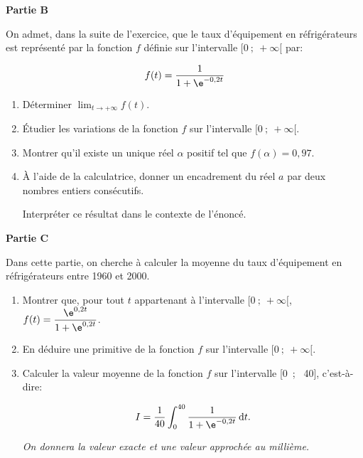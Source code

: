 \medskip

\textbf{Partie B}

\medskip

On admet, dans la suite de l'exercice, que le taux d'équipement en réfrigérateurs est représenté par la fonction $f$ définie sur l'intervalle $[0~;~+\infty[$ par:

\[f(t) = \dfrac{1}{1+ \e^{-0,2t}}\]

\begin{enumerate}
\item Déterminer $\displaystyle\lim_{t \to + \infty} f(t)$.
\item Étudier les variations de la fonction $f$ sur l'intervalle $[0~;~+\infty[$.
\item Montrer qu'il existe un unique réel $\alpha$ positif tel que $f(\alpha) = 0,97$.
\item À l'aide de la calculatrice, donner un encadrement du réel $a$ par deux nombres entiers
consécutifs.

Interpréter ce résultat dans le contexte de l'énoncé.
\end{enumerate}

\medskip

\textbf{Partie C}

\medskip

Dans cette partie, on cherche à calculer la moyenne du taux d'équipement en réfrigérateurs entre 1960 et 2000.

\medskip

\begin{enumerate}
\item Montrer que, pour tout $t$ appartenant à l'intervalle $[0~;~+\infty[$,\: $f(t) = \dfrac{\e^{0,2t}}{1 + \e^{0,2t}}$.
\item En déduire une primitive de la fonction $f$ sur l'intervalle $[0~;~+\infty[$.
\item Calculer la valeur moyenne de la fonction $f$ sur l'intervalle [0~;~ 40], c'est-à-dire:

\[I = \dfrac{1}{40}\displaystyle\int_0^{40} \dfrac{1}{1 + \e^{-0,2t}}\,\text{d}t.\]

\emph{On donnera la valeur exacte et une valeur approchée au millième.}
\end{enumerate}
